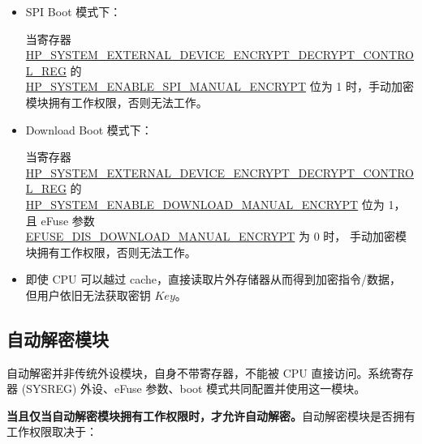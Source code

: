 \documentclass[main\_\_CN.tex]{subfiles}
\begin{document}
\begin{itemize}

    \item SPI Boot 模式下：
    
    当寄存器 \hyperref[regdesc:HPSYSTEMEXTERNALDEVICEENCRYPTDECRYPTCONTROLREG]{HP\_SYSTEM\_EXTERNAL\_DEVICE\_ENCRYPT\_DECRYPT\_CONTROL\_REG} 的 \\ \hyperref[fielddesc:HPSYSTEMENABLESPIMANUALENCRYPT]{HP\_SYSTEM\_ENABLE\_SPI\_MANUAL\_ENCRYPT} 位为 1 时，手动加密模块拥有工作权限，否则无法工作。
    
    \item Download Boot 模式下：
    
    当寄存器 \hyperref[regdesc:HPSYSTEMEXTERNALDEVICEENCRYPTDECRYPTCONTROLREG]{HP\_SYSTEM\_EXTERNAL\_DEVICE\_ENCRYPT\_DECRYPT\_CONTROL\_REG} 的\\ \hyperref[fielddesc:HPSYSTEMENABLEDOWNLOADMANUALENCRYPT]{HP\_SYSTEM\_ENABLE\_DOWNLOAD\_MANUAL\_ENCRYPT} 位为 1，且 eFuse 参数\\ \hyperref[fielddesc:EFUSEDISDOWNLOADMANUALENCRYPT]{EFUSE\_DIS\_DOWNLOAD\_MANUAL\_ENCRYPT} 为 0 时，
    手动加密模块拥有工作权限，否则无法工作。
    
\end{itemize}

\begin{tiplisting}
\vspace{-2em}
\begin{itemize}
\item 即使 CPU 可以越过 cache，直接读取片外存储器从而得到加密指令/数据，
但用户依旧无法获取密钥 \begin{math}\mathit{Key}\end{math}。
\end{itemize}
\end{tiplisting}


\subsection{自动解密模块}

自动解密并非传统外设模块，自身不带寄存器，不能被 CPU 直接访问。系统寄存器 (SYSREG) 外设、eFuse 参数、boot 模式共同配置并使用这一模块。

\textbf{当且仅当自动解密模块拥有工作权限时，才允许自动解密。}自动解密模块是否拥有工作权限取决于：
\end{document}
